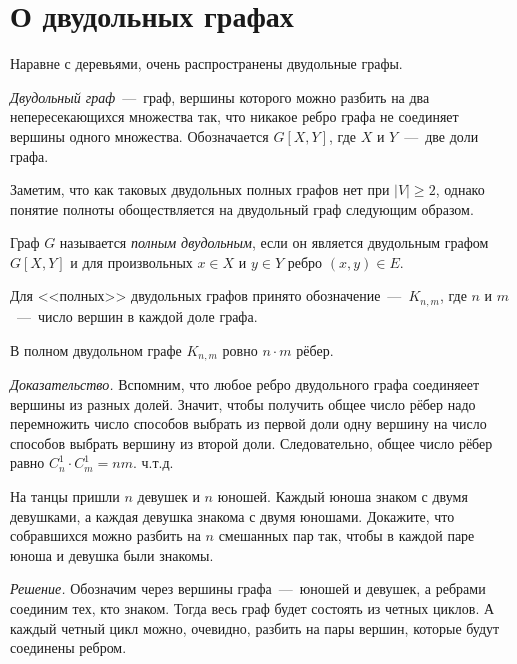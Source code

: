 \section{О двудольных графах}

Наравне с деревьями, очень распространены двудольные графы.
	
	
\begin{definition}
	\emph{Двудольный граф}~---~граф, вершины которого можно разбить на два непересекающихся множества так, 
	что никакое ребро графа не соединяет вершины одного множества. Обозначается $G[X, Y]$, где $X$ и $Y$~---~две доли графа.
\end{definition}

	Заметим, что как таковых двудольных полных графов нет при $|V| \geqslant 2$, 
	однако понятие полноты обоществляется на двудольный граф следующим образом.
	
\begin{definition}
	Граф $G$ называется \emph{полным двудольным}, если он является двудольным графом $G[X, Y]$ и 
	для произвольных $x \in X$ и $y \in Y$ ребро $(x, y) \in E$.
\end{definition}

	Для <<полных>> двудольных графов принято обозначение~---~$K_{n,m}$, где $n$ и $m$~---~число вершин в каждой доле графа.

\begin{statement}
	В полном двудольном графе $K_{n, m}$ ровно $n\cdot m$ рёбер.
	
	\emph{Доказательство.} Вспомним, что любое ребро двудольного графа соединяеет вершины из разных долей. 
	Значит, чтобы получить общее число рёбер надо перемножить число способов выбрать из первой доли одну 
	вершину на число способов выбрать вершину из второй доли. Следовательно, общее число рёбер равно $C_n^1 \cdot C_m^1 = nm$. ч.т.д.
\end{statement}
	
\begin{example}
	На танцы пришли $n$ девушек и $n$ юношей. Каждый юноша знаком с двумя девушками, 
	а каждая девушка знакома с двумя юношами. Докажите, что собравшихся можно разбить на $n$ смешанных пар так, 
	чтобы в каждой паре юноша и девушка были знакомы.
	
	\emph{Решение.} Обозначим через вершины графа~---~юношей и девушек, а ребрами соединим тех, кто знаком. 
	Тогда весь граф будет состоять из четных циклов. А каждый четный цикл можно, очевидно, 
	разбить на пары вершин, которые будут соединены ребром.
\end{example}

